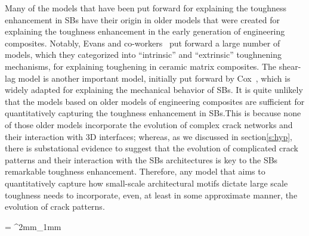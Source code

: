 \documentclass[10pt,letterpaper]{article}
\begin{document}
Many of the  models that have been put forward for explaining the  toughness enhancement in SBs have their origin in older models that were created  for explaining  the  toughness enhancement in the early generation of engineering  composites. Notably, Evans and co-workers~\cite{XX}  put forward a large number of models, which  they categorized into  ``intrinsic'' and ``extrinsic''  toughnening mechanisms, for  explaining toughening in ceramic matrix composites. The  shear-lag model is another  important  model, initially put forward by Cox~\cite{XX}, which is widely adapted  for explaining the mechanical behavior of SBs. It is quite unlikely that  the models based on older models of engineering composites are sufficient for quantitatively capturing the toughness enhancement in SBs.This is because  none of those older models incorporate  the  evolution of complex crack networks and their interaction with 3D interfaces; whereas, as we discussed in section\ref{s:hyp}, there is substational evidence to suggest that the evolution of complicated crack patterns  and their interaction with the  SBs architectures is key to the SBs remarkable toughness enhancement. Therefore, any model that aims to  quantitatively capture  how  small-scale  architectural motifs dictate large scale toughness  needs to incorporate, even, at least  in some approximate manner, the evolution of  crack patterns.%

\tabulinesep = ^2mm_1mm
\everyrow{\tabucline[.4mm  white]{}}
\end{document}
